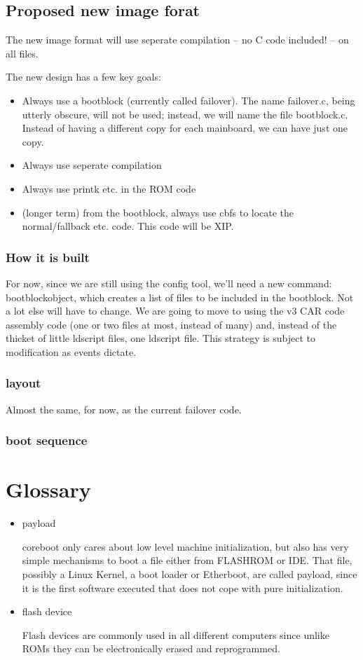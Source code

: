 \documentclass[titlepage,12pt]{article}
\begin{document}
\subsection{Proposed new image forat}
The new image format will use seperate compilation -- no C code included! -- on all files.

The new design has a few key goals:
\begin{itemize}
\item Always use a bootblock (currently called failover).
The name failover.c, being utterly obscure, will not be used; instead, we will name the file bootblock.c. Instead of having a different copy for each mainboard, we can have just one copy.
\item Always use seperate compilation
\item Always use printk etc. in the ROM code
\item (longer term) from the bootblock, always use cbfs to locate the normal/fallback etc. code. This code will be XIP.
\end{itemize}

\subsubsection{How it is built}
For now, since we are still using the config tool, we'll need a new command: bootblockobject, which creates a list of files to be included in the bootblock.   Not a lot else will have to change. We are going to move to using the v3 CAR code assembly code (one or two files at most, instead of many) and, instead of the thicket of little ldscript files, one ldscript file. This strategy is subject to modification as events dictate.
\subsubsection{layout}
Almost the same, for now, as the current failover code.
\subsubsection{boot sequence}
%
%

\section{Glossary}
\begin{itemize}
\item payload

coreboot only cares about low level machine initialization, but also has
very simple mechanisms to boot a file either from FLASHROM or IDE. That
file, possibly a Linux Kernel, a boot loader or Etherboot, are called
payload, since it is the first software executed that does not cope with
pure initialization.

\item flash device

Flash devices are commonly used in all different computers since unlike
ROMs they can be electronically erased and reprogrammed.
\end{itemize}
\end{document}
